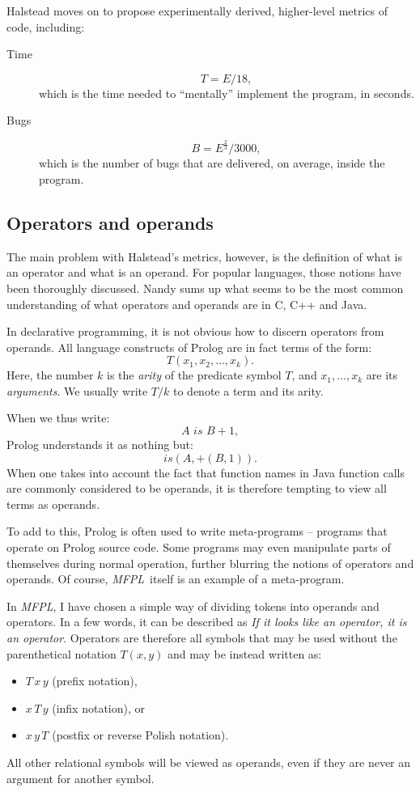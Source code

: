 \documentclass[11pt,a4paper,twoside]{article}
\newcommand{\pname}{\emph{MFPL}}
\begin{document}
\begin{multicols}{2}
Halstead moves on to propose experimentally derived, higher-level
metrics of code, including:
\begin{description}
\item[Time]
$$T = E/18,$$ which is the time needed to ``mentally'' implement the
  program, in seconds.
\item[Bugs]
$$B = E^{\frac{2}{3}}/3000,$$ which is the number of bugs that are
  delivered, on average, inside the program.
\end{description}

\subsection{Operators and operands}
The main problem with Halstead's metrics, however, is the definition
of what is an operator and what is an operand. For popular languages,
those notions have been thoroughly discussed. Nandy \cite{nandy} sums
up what seems to be the most common understanding of what operators
and operands are in C, C++ and Java. 

In declarative programming, it is not obvious how to discern operators
from operands. All language constructs of Prolog are in fact terms of
the form:
$$T(x_1, x_2, \dots, x_k).$$ 
Here, the number $k$ is the \emph{arity}
of the predicate symbol $T$, and $x_1, \dots, x_k$ are its
\emph{arguments}. We usually write $T/k$ to denote a term and its arity. 

When we thus write:
$$A\,\, is\,\, B + 1,$$ 
Prolog understands it as nothing but:
$$is(A, +(B, 1)).$$ When one takes into account the fact that function
names in Java function calls are commonly considered to be operands,
it is therefore tempting to view all terms as operands.

To add to this, Prolog is often used to write meta-programs --
programs that operate on Prolog source code. Some programs may even
manipulate parts of themselves during normal operation, further
blurring the notions of operators and operands. Of course,
\pname\ itself is an example of a meta-program.

In \pname, I have chosen a simple way of dividing tokens into operands
and operators. In a few words, it can be described as \emph{If it looks
  like an operator, it is an operator}. Operators are therefore all
symbols that may be used without the parenthetical notation $T(x, y)$
and may be instead written as: 
\begin{itemize}
\item $T\, x\, y$ (prefix notation),
\item $x\,T\, y$ (infix notation), or 
\item $x\, y\, T$ (postfix or reverse Polish notation).
\end{itemize}
All other relational symbols will be viewed as operands, even if they
are never an argument for another symbol.


\end{multicols}
\end{document}

